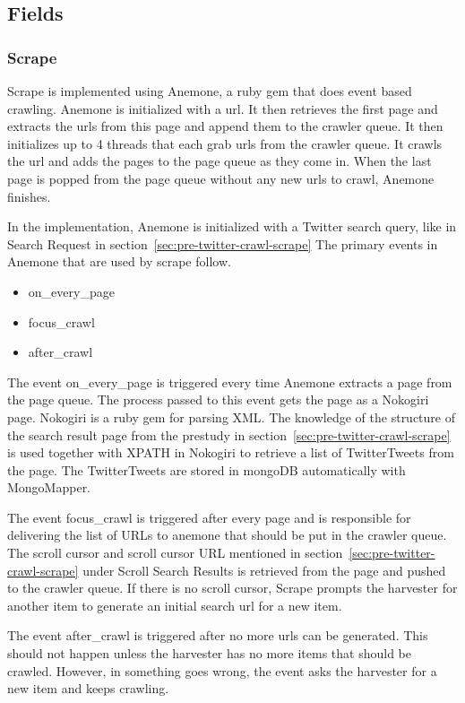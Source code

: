 \subsection{Fields}
\subsubsection{Scrape}
Scrape is implemented using Anemone, a ruby gem that does event based crawling. Anemone is initialized with a url. It then retrieves the first page and extracts the urls from this page and append them to the crawler queue. It then initializes up to 4 threads that each grab urls from the crawler queue. It crawls the url and adds the pages to the page queue as they come in. When the last page is popped from the page queue without any new urls to crawl, Anemone finishes.

In the implementation, Anemone is initialized with a Twitter search query, like in Search Request in section~\ref{sec:pre-twitter-crawl-scrape}
The primary events in Anemone that are used by scrape follow.

	\begin{itemize}
	\item on\_every\_page
	\item focus\_crawl
	\item after\_crawl
	\end{itemize}

The event on\_every\_page is triggered every time Anemone extracts a page from the page queue. The process passed to this event gets the page as a Nokogiri page. Nokogiri is a ruby gem for parsing XML. The knowledge of the structure of the search result page from the prestudy in section~\ref{sec:pre-twitter-crawl-scrape} is used together with XPATH in Nokogiri to retrieve a list of TwitterTweets from the page. The TwitterTweets are stored in mongoDB automatically with MongoMapper.

The event focus\_crawl is triggered after every page and is responsible for delivering the list of URLs to anemone that should be put in the crawler queue. The scroll cursor and scroll cursor URL mentioned in section~\ref{sec:pre-twitter-crawl-scrape} under Scroll Search Results is retrieved from the page and pushed to the crawler queue. If there is no scroll cursor, Scrape prompts the harvester for another item to generate an initial search url for a new item.

The event after\_crawl is triggered after no more urls can be generated. This should not happen unless the harvester has no more items that should be crawled. However, in something goes wrong, the event asks the harvester for a new item and keeps crawling.

